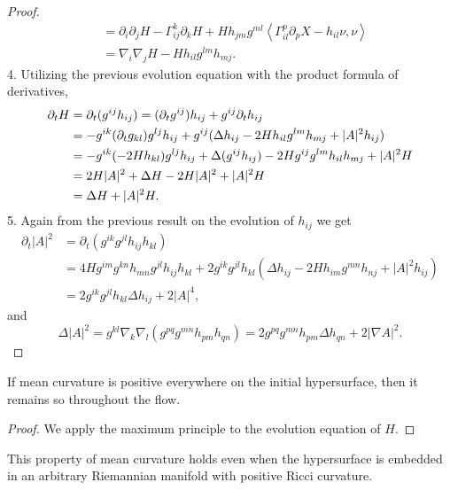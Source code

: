 \begin{proof}
\begin{align*}
& = \partial_{i}\partial_{j}H - \Gamma_{ij}^{k}\partial_{k}H + Hh_{jm}g^{ml}\left< \Gamma_{il}^{p}\partial_{p}X- h_{il}\nu, \nu \right> \\
& = \nabla_{i}\nabla_{j}H- Hh_{il}g^{lm}h_{mj}.
\end{align*}
4. Utilizing the previous evolution equation with the product formula of derivatives, 
\begin{align*}
\partial_t H &= \partial_t(g^{ij}h_{ij}) = (\partial_{t}g^{ij})h_{ij}+ g^{ij}\partial_{t}h_{ij}\\
& = -g^{ik}(\partial_{t}g_{kl})g^{lj}h_{ij}+ g^{ij}(\Delta h_{ij} - 2Hh_{il}g^{lm}h_{mj}+|A|^2h_{ij})\\
& = -g^{ik}(-2Hh_{kl})g^{lj}h_{ij}+ \Delta(g^{ij}h_{ij}) - 2Hg^{ij}g^{lm}h_{il}h_{mj}+|A|^2H\\
& = 2H|A|^2 + \Delta H - 2H|A|^2 + |A|^2H\\
& =  \Delta H+ |A|^2H.
\end{align*}
5. Again from the previous result on the evolution of $ h_{ij} $ we get \begin{align*}
    \partial_{t}|A|^{2} & = \partial_{t}(g^{ik}g^{jl}h_{ij}h_{kl}) \\
    & = 4H g^{im}g^{kn}h_{mn}g^{jl}h_{ij}h_{kl} + 2g^{ik}g^{jl}h_{kl}(\Delta h_{ij}-2Hh_{im}g^{mn}h_{nj}+|A|^{2}h_{ij}) \\
    & = 2g^{ik}g^{jl}h_{kl}\Delta h_{ij} +2|A|^{4}, 
\end{align*}
and 
\[ \Delta |A|^{2} = g^{kl}\nabla_{k}\nabla_{l}(g^{pq}g^{mn}h_{pm}h_{qn}) = 2g^{pq}g^{mn}h_{pm}\Delta h_{qn} + 2|\nabla A|^{2}. \]
\end{proof}
\begin{corollary}
If mean curvature is positive everywhere on the initial hypersurface, then it remains so throughout the flow.
\end{corollary}
\begin{proof}
We apply the maximum principle to the evolution equation of $H$.
\end{proof}
\begin{remark}
This property of mean curvature holds even when the hypersurface is embedded in an arbitrary Riemannian manifold with positive Ricci curvature. 
\end{remark}
